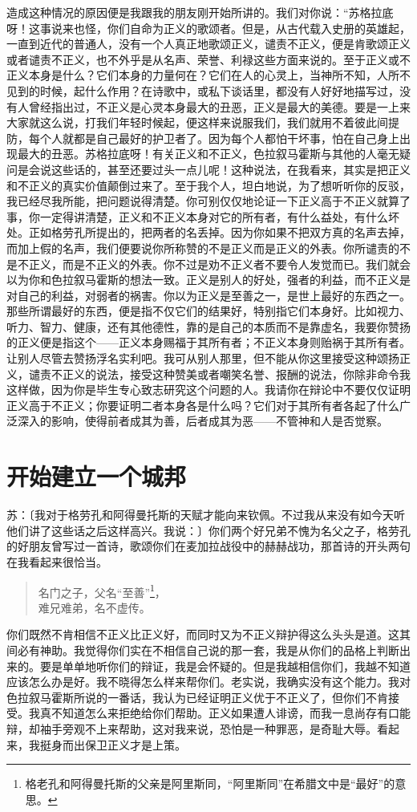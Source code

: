 \documentclass[11pt,oneside]{book}
\begin{document}
\begin{common-format}
造成这种情况的原因便是我跟我的朋友刚开始所讲的。我们对你说：“苏格拉底呀！这事说来也怪，你们自命为正义的歌颂者。但是，从古代载入史册的英雄起，一直到近代的普通人，没有一个人真正地歌颂正义，谴责不正义，便是肯歌颂正义或者谴责不正义，也不外乎是从名声、荣誉、利禄这些方面来说的。至于正义或不正义本身是什么？它们本身的力量何在？它们在人的心灵上，当神所不知，人所不见到的时候，起什么作用？在诗歌中，或私下谈话里，都没有人好好地描写过，没有人曾经指出过，不正义是心灵本身最大的丑恶，正义是最大的美德。要是一上来大家就这么说，打我们年轻时候起，便这样来说服我们，我们就用不着彼此间提防，每个人就都是自己最好的护卫者了。因为每个人都怕干坏事，怕在自己身上出现最大的丑恶。苏格拉底呀！有关正义和不正义，色拉叙马霍斯与其他的人毫无疑问是会说这些话的，甚至还要过头一点儿呢！这种说法，在我看来，其实是把正义和不正义的真实价值颠倒过来了。至于我个人，坦白地说，为了想听听你的反驳，我已经尽我所能，把问题说得清楚。你可别仅仅地论证一下正义高于不正义就算了事，你一定得讲清楚，正义和不正义本身对它的所有者，有什么益处，有什么坏处。正如格劳孔所提出的，把两者的名丢掉。因为你如果不把双方真的名声去掉，而加上假的名声，我们便要说你所称赞的不是正义而是正义的外表。你所谴责的不是不正义，而是不正义的外表。你不过是劝不正义者不要令人发觉而已。我们就会以为你和色拉叙马霍斯的想法一致。正义是别人的好处，强者的利益，而不正义是对自己的利益，对弱者的祸害。你以为正义是至善之一，是世上最好的东西之一。那些所谓最好的东西，便是指不仅它们的结果好，特别指它们本身好。比如视力、听力、智力、健康，还有其他德性，靠的是自己的本质而不是靠虚名，我要你赞扬的正义便是指这个——正义本身赐福于其所有者；不正义本身则贻祸于其所有者。让别人尽管去赞扬浮名实利吧。我可从别人那里，但不能从你这里接受这种颂扬正义，谴责不正义的说法，接受这种赞美或者嘲笑名誉、报酬的说法，你除非命令我这样做，因为你是毕生专心致志研究这个问题的人。我请你在辩论中不要仅仅证明正义高于不正义；你要证明二者本身各是什么吗？它们对于其所有者各起了什么广泛深入的影响，使得前者成其为善，后者成其为恶——不管神和人是否觉察。


\section{开始建立一个城邦}
苏：〔我对于格劳孔和阿得曼托斯的天赋才能向来钦佩。不过我从来没有如今天听他们讲了这些话之后这样高兴。我说：〕你们两个好兄弟不愧为名父之子，格劳孔的好朋友曾写过一首诗，歌颂你们在麦加拉战役中的赫赫战功，那首诗的开头两句在我看起来很恰当。
\begin{verse}
名门之子，父名“至善”\footnote{格老孔和阿得曼托斯的父亲是阿里斯同，“阿里斯同”在希腊文中是“最好”的意思。}，\\
难兄难弟，名不虚传。
\end{verse}
你们既然不肯相信不正义比正义好，而同时又为不正义辩护得这么头头是道。这其间必有神助。我觉得你们实在不相信自己说的那一套，我是从你们的品格上判断出来的。要是单单地听你们的辩证，我是会怀疑的。但是我越相信你们，我越不知道应该怎么办是好。我不晓得怎么样来帮你们。老实说，我确实没有这个能力。我对色拉叙马霍斯所说的一番话，我认为已经证明正义优于不正义了，但你们不肯接受。我真不知道怎么来拒绝给你们帮助。正义如果遭人诽谤，而我一息尚存有口能辩，却袖手旁观不上来帮助，这对我来说，恐怕是一种罪恶，是奇耻大辱。看起来，我挺身而出保卫正义才是上策。


\end{common-format}
\end{document}
